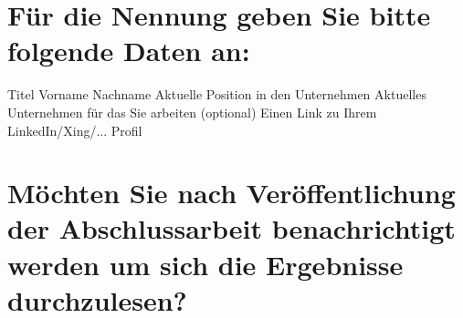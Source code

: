 \section*{Für die Nennung geben Sie bitte folgende Daten an:}
Titel Vorname Nachname\newline
Aktuelle Position in den Unternehmen\newline
Aktuelles Unternehmen für das Sie arbeiten\newline
(optional) Einen Link zu Ihrem LinkedIn/Xing/... Profil\newline
\langantwort

\section*{Möchten Sie nach Veröffentlichung der Abschlussarbeit benachrichtigt werden um sich die Ergebnisse durchzulesen?}

